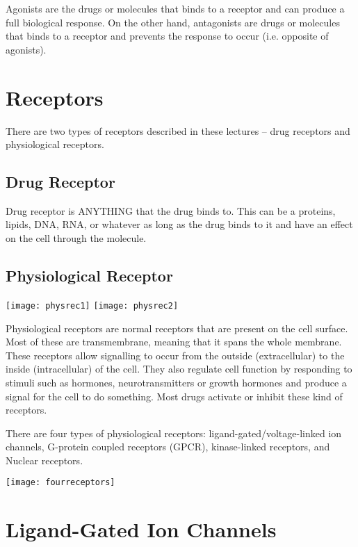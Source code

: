 Agonists are the drugs or molecules that binds to a receptor and can produce a full biological response.
On the other hand, antagonists are drugs or molecules that binds to a receptor and prevents the response to occur (i.e. opposite of agonists).

\section{Receptors}

There are two types of receptors described in these lectures -- drug receptors and physiological receptors.

\subsection{Drug Receptor}

Drug receptor is ANYTHING that the drug binds to.
This can be a proteins, lipids, DNA, RNA, or whatever as long as the drug binds to it and have an effect on the cell through the molecule.

\subsection{Physiological Receptor}

\begin{center}
\texttt{[image: physrec1]}
\texttt{[image: physrec2]}
\end{center}

Physiological receptors are normal receptors that are present on the cell surface.
Most of these are transmembrane, meaning that it spans the whole membrane.
These receptors allow signalling to occur from the outside (extracellular) to the inside (intracellular) of the cell.
They also regulate cell function by responding to stimuli such as hormones, neurotransmitters or growth hormones and produce a signal for the cell to do something.
Most drugs activate or inhibit these kind of receptors.

There are four types of physiological receptors: ligand-gated/voltage-linked ion channels, G-protein coupled receptors (GPCR), kinase-linked receptors, and Nuclear receptors.

\begin{center}
\texttt{[image: fourreceptors]}
\end{center}

\section{Ligand-Gated Ion Channels}

